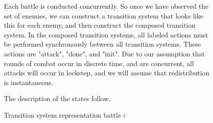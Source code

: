 \documentclass[11pt]{article}
\theoremstyle{definition}
\begin{document}
\begin{figure}
    \caption{Transition system representation battle $i$}
    \label{tikz:battle}
    \begin{center}
    \end{center}
    \small
    \justify
    \par
    Each battle is conducted concurrently. So once we
    have observed the set of enemies, we can construct
    a transition system that looks like this for each enemy,
    and then construct the composed transition system.
    In the composed transition systems, all labeled actions
    must be performed synchronously between all
    transition systems. These actions are "attack", "done", and "init".
    Due to our assumption that rounds of combat
    occur in discrete time, and are concurrent,
    all attacks will occur in lockstep, and
    we will assume that redistribution is instantaneous.

    The description of the states follow.


\end{figure}
\end{document}
